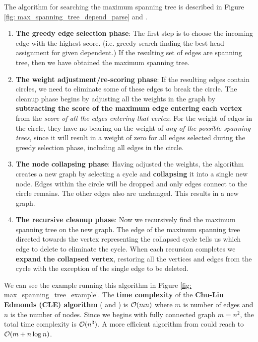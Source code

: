 \documentclass[11pt]{article}
\begin{document}
The algorithm for searching the maximum spanning tree is described in Figure \ref{fig: max_spanning_tree_depend_parse} \citep{chu1965shortest} and \citep{edmonds1968optimum}. 
\begin{enumerate}
\item \textbf{The greedy edge selection phase}: The first step is to choose the incoming edge with the highest score. (i.e. greedy search finding the best head assignment for given dependent.) If the resulting set of edges are spanning tree, then we have obtained the maximum spanning tree. 

\item \textbf{The weight adjustment/re-scoring phase}: If the resulting edges contain circles, we need to eliminate some of these edges to break the circle. The cleanup phase begins by adjusting all the weights in the graph by \textbf{subtracting the score of the maximum edge entering each vertex} from the \emph{score of all the edges entering that vertex}. For the weight of edges in the circle, they have no bearing on the weight of \emph{any of the possible spanning trees}, since it will result in a weight of zero for all edges selected during the greedy selection phase, including all edges in the circle.

\item \textbf{The node collapsing phase}: Having adjusted the weights, the algorithm creates a new graph by selecting a
cycle and \textbf{collapsing} it into a single new node. Edges within the circle will be dropped and only edges connect to the circle remains. The other edges also are unchanged. This results in a new graph.

\item \textbf{The recursive cleanup phase}: Now we recursively find the maximum spanning tree on the new graph. The edge of the maximum spanning tree directed towards the vertex representing the collapsed cycle tells us which edge to delete to eliminate the cycle. When each recursion completes we \textbf{expand the collapsed vertex}, restoring all the vertices and edges from the cycle with the exception of the single edge to be deleted.
\end{enumerate}
We can see the example running this algorithm in Figure \ref{fig: max_spanning_tree_example}. The \textbf{time complexity} of the \textbf{Chu-Liu Edmonds (CLE) algorithm} (\citep{chu1965shortest} and \citep{edmonds1968optimum}) is ${\mathcal O}(mn)$ where $m$ is number of edges and $n$ is the number of nodes. Since we begins with fully connected graph $m=n^2$, the total time complexity is ${\mathcal O}(n^3)$. A more efficient algorithm from \citep{gabow1986efficient} could reach to ${\mathcal O}(m + n\log n)$.
\end{document}
